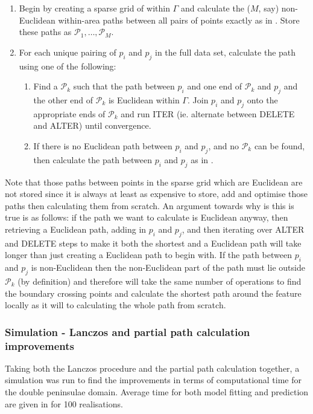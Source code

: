 {\begin{enumerate}
 \item Begin by creating a sparse grid of within $\Gamma$ and calculate the ($M$, say) non-Euclidean within-area paths between all pairs of points exactly as in . Store these paths as $\mathcal{P}_1,\ldots, \mathcal{P}_M$.
\item For each unique pairing of $p_i$ and $p_j$ in the full data set, calculate the path using one of the following:
	\begin{enumerate}
	\item Find a $\mathcal{P}_k$ such that the path between $p_i$ and one end of $\mathcal{P}_k$ and $p_j$ and the other end of $\mathcal{P}_k$ is Euclidean within $\Gamma$. Join $p_i$ and $p_j$ onto the appropriate ends of $\mathcal{P}_k$ and run ITER (ie. alternate between DELETE and ALTER) until convergence.
	\item If there is no Euclidean path between $p_i$ and $p_j$, and no $\mathcal{P}_k$ can be found, then calculate the path between $p_i$ and $p_j$ as in . 
	\end{enumerate}
\end{enumerate}

Note that those paths between points in the sparse grid which are Euclidean are not stored since it is always at least as expensive to store, add and optimise those paths then calculating them from scratch. An argument towards why is this is true is as follows: if the path we want to calculate is Euclidean anyway, then retrieving a Euclidean path, adding in $p_i$ and $p_j$, and then iterating over ALTER and DELETE steps to make it both the shortest and a Euclidean path will take longer than just creating a Euclidean path to begin with. If the path between $p_i$ and $p_j$ is non-Euclidean then the non-Euclidean part of the path must lie outside $\mathcal{P}_k$ (by definition) and therefore will take the same number of operations to find the boundary crossing points and calculate the shortest path around the feature locally as it will to calculating the whole path from scratch.


\subsubsection{Simulation - Lanczos and partial path calculation improvements}

Taking both the Lanczos procedure and the partial path calculation together, a simulation was run to find the improvements in terms of computational time for the double peninsulae domain. Average time for both model fitting and prediction are given in  for 100 realisations. 

}
